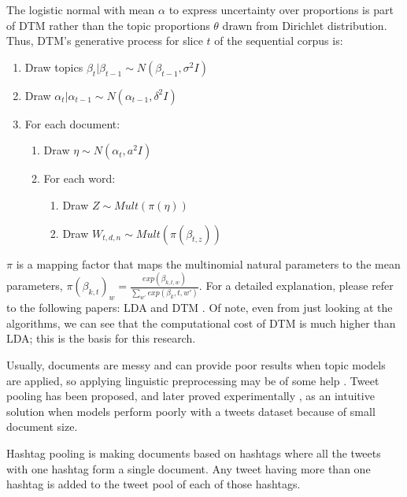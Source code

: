 The logistic normal with mean $ \alpha $ to express uncertainty over proportions is part of DTM rather than the topic proportions $\theta$ drawn from Dirichlet distribution. Thus, DTM's generative process for slice $t$ of the sequential corpus is:

\begin{enumerate}
\item Draw topics $ \beta_t | \beta_{t-1}  \sim N(\beta_{t-1}, \sigma^2I) $
\item Draw $ \alpha_t | \alpha_{t-1}  \sim N(\alpha_{t-1}, \delta^2I) $
\item For each document:
\begin{enumerate}
\item Draw $ \eta \sim N(\alpha_t, a^2I)$
\item For each word:
\begin{enumerate}
\item Draw $Z \sim Mult(\pi(\eta)) $
\item Draw $W_{t,d,n} \sim Mult(\pi(\beta_{t,z})) $
\end{enumerate}
\end{enumerate}
\end{enumerate}

$\pi$ is a mapping factor that maps the multinomial natural parameters to the mean parameters, $\pi(\beta_{k, t})_w = \frac{exp(\beta_{k,t,w})}{\sum_{w'} exp(\beta_k,t,w')}$. For a detailed explanation, please refer to the following papers: LDA \cite{blei2003latent} and DTM \cite{blei2006dynamic}. Of note, even from just looking at the algorithms, we can see that the computational cost of DTM is much higher than LDA; this is the basis for this research.

Usually, documents are messy and can provide poor results when topic models are applied, so applying linguistic preprocessing may be of some help \cite{han2012automatically}. Tweet pooling has been proposed, and later proved experimentally \cite{mehrotra2013improving}, as an intuitive solution \cite{hong2010empirical,zhao2011comparing} when models perform poorly with a tweets dataset because of small document size.

Hashtag pooling is making documents based on hashtags where all the tweets with one hashtag form a single document. Any tweet having more than one hashtag is added to the tweet pool of each of those hashtags.